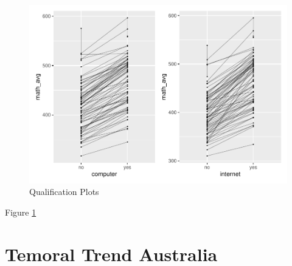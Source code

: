 \begin{Schunk}
\begin{figure}[H]
\includegraphics[width=1\linewidth]{learningtower_files/figure-latex/compint-plot-1} \caption[Qualification Plots]{Qualification Plots}\label{fig:compint-plot}
\end{figure}
\end{Schunk}

Figure \ref{fig:compint-plot}

\hypertarget{temoral-trend-australia}{%
\section{Temoral Trend Australia}\label{temoral-trend-australia}}



\address{%
Priya Ravindra Dingorkar\\
Monash University\\%
Department Econometrics and Business Statistics\\ Clayton, Australia\\
%
\url{https://www.linkedin.com/in/priya-dingorkar/}\\%
%
\href{mailto:priyadingorkar@gmail.com}{\nolinkurl{priyadingorkar@gmail.com}}%
}

\address{%
Kevin Y.X. Wang\\
University of Sydney\\%
Data scientist\\ Illumina, Inc.\\ School of Mathematics and
Statistics\\ Sydney, Australia\\
%
\url{https://kevinwang09.github.io/}\\%
%
\href{mailto:kevinwangstats@gmail.com}{\nolinkurl{kevinwangstats@gmail.com}}%
}

\address{%
Dianne Cook\\
Monash University\\%
Department Econometrics and Business Statistics\\ Clayton, Australia\\
%
\url{http://dicook.org/}\\%
%
\href{mailto:dicook@monash.edu}{\nolinkurl{dicook@monash.edu}}%
}
